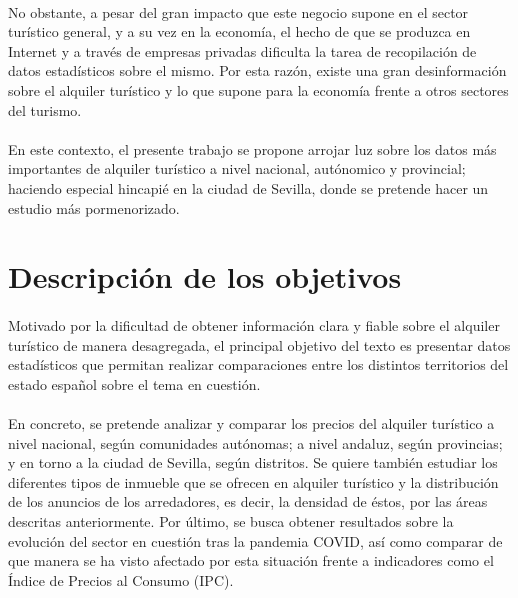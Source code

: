 \documentclass[a4paper,10pt]{article}
\begin{document}
\begin{multicols}{2}
            \paragraph*{}
            No obstante, a pesar del gran impacto que este negocio supone en el sector turístico general, y a su vez en la economía, el hecho de que se
            produzca en Internet y a través de empresas privadas dificulta la tarea de recopilación de datos estadísticos sobre el mismo. Por esta razón,
            existe una gran desinformación sobre el alquiler turístico y lo que supone para la economía frente a otros sectores del turismo.
            \vfill\null

            \columnbreak
            \paragraph*{}
            En este contexto, el presente trabajo se propone arrojar luz sobre los datos más importantes de alquiler turístico a nivel nacional, autónomico y 
            provincial; haciendo especial hincapié en la ciudad de Sevilla, donde se pretende hacer un estudio más pormenorizado. 

        \section{Descripción de los objetivos}

            \paragraph*{}
            Motivado por la dificultad de obtener información clara y fiable sobre el alquiler turístico de manera desagregada,
            el principal objetivo del texto es presentar datos estadísticos que permitan realizar comparaciones entre los distintos
            territorios del estado español sobre el tema en cuestión.
            
            \paragraph*{}
            En concreto, se pretende analizar y comparar los precios del alquiler turístico a nivel nacional, según comunidades 
            autónomas; a nivel andaluz, según provincias; y en torno a la ciudad de Sevilla, según distritos. Se quiere también estudiar los diferentes tipos de 
            inmueble que se ofrecen en alquiler turístico y la distribución de los anuncios de los arredadores, es decir, la densidad de éstos, por las áreas 
            descritas anteriormente. Por último, se busca obtener resultados sobre la evolución del sector en cuestión tras la pandemia COVID, así como 
            comparar de que manera se ha visto afectado por esta situación frente a indicadores como el Índice de Precios al Consumo (IPC).
       

\end{multicols}
\end{document}
